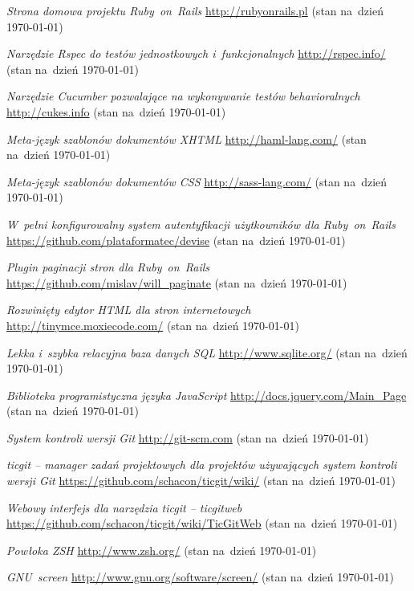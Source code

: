 \begin{thebibliography}{99}

   \emph{Strona domowa projektu Ruby~on~Rails} \url{http://rubyonrails.pl} (stan na~dzień \today)

   \emph{Narzędzie Rspec do testów jednostkowych i~funkcjonalnych} \url{http://rspec.info/} (stan na~dzień \today)

   \emph{Narzędzie Cucumber pozwalające na wykonywanie testów behavioralnych} \url{http://cukes.info} (stan na~dzień \today)

   \emph{Meta-język szablonów dokumentów XHTML} \url{http://haml-lang.com/} (stan na~dzień \today)

   \emph{Meta-język szablonów dokumentów CSS} \url{http://sass-lang.com/} (stan na~dzień \today)

   \emph{W~pełni konfigurowalny system autentyfikacji użytkowników dla Ruby~on~Rails} \url{https://github.com/plataformatec/devise} (stan na~dzień \today)

   \emph{Plugin paginacji stron dla Ruby~on~Rails} \url{https://github.com/mislav/will_paginate} (stan na~dzień \today)

   \emph{Rozwinięty edytor HTML dla stron internetowych} \url{http://tinymce.moxiecode.com/} (stan na~dzień \today)

   \emph{Lekka i~szybka relacyjna baza danych SQL} \url{http://www.sqlite.org/} (stan na~dzień \today)

   \emph{Biblioteka programistyczna języka JavaScript} \url{http://docs.jquery.com/Main_Page} (stan na~dzień \today)

   \emph{System kontroli wersji Git} \url{http://git-scm.com} (stan na~dzień \today)

   \emph{ticgit -- manager zadań projektowych dla projektów używających system kontroli wersji Git} \url{https://github.com/schacon/ticgit/wiki/} (stan na~dzień \today)

   \emph{Webowy interfejs dla narzędzia ticgit -- ticgitweb} \url{https://github.com/schacon/ticgit/wiki/TicGitWeb} (stan na~dzień \today)

   \emph{Powłoka ZSH} \url{http://www.zsh.org/} (stan na~dzień \today)

   \emph{GNU~screen} \url{http://www.gnu.org/software/screen/} (stan na~dzień \today)


\end{thebibliography}
